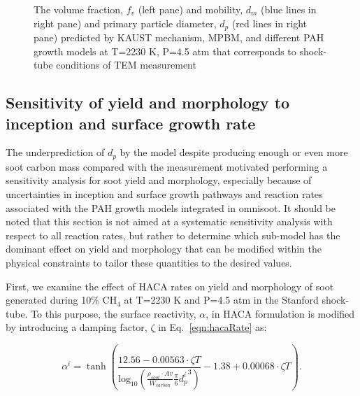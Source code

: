 \begin{figure}[H]
\begin{subfigure}[t]{0.32\textwidth}
	\end{subfigure}
	\caption{The volume fraction, $f_v$ (left pane) and mobility, $d_m$ (blue lines in right pane) and primary particle diameter, $d_p$ (red lines in right pane) predicted by KAUST mechanism, MPBM, and different PAH growth models at T=2230 K, P=4.5 atm that corresponds to shock-tube conditions of TEM measurement}
	\label{fig:shocktube_TEM_fvdd} 
\end{figure}

\subsection{Sensitivity of yield and morphology to inception and surface growth rate}

The underprediction of $d_p$ by the model despite producing enough or even more soot carbon mass compared with the measurement motivated performing a sensitivity analysis for soot yield and morphology, especially because of uncertainties in inception and surface growth pathways and reaction rates associated with the PAH growth models integrated in omnisoot. It should be noted that this section is not aimed at a systematic sensitivity analysis with respect to all reaction rates, but rather to determine which sub-model has the dominant effect on yield and morphology that can be modified within the physical constraints to tailor these quantities to the desired values.

First, we examine the effect of HACA rates on yield and morphology of soot generated during 10\% $\mathrm{CH_4}$ at T=2230 K and P=4.5 atm in the Stanford shock-tube. To this  purpose, the surface reactivity, $\alpha$, in HACA formulation is modified by introducing a damping factor, $\zeta$ in Eq.~\eqref{eqn:hacaRate} as:

\begin{equation}
	\alpha^i = \tanh 
	\left(
	\frac{12.56 - 0.00563\cdot \zeta T}
	{\mbox{log}_{10}
		\left( \frac{\rho_{soot}\cdot Av}{W_{carbon}} \frac{\pi}{6}{d^i_p}^3 \right) } -1.38+0.00068\cdot \zeta T
	\right)
	\label{eqn:alpha_modified}.
\end{equation}


